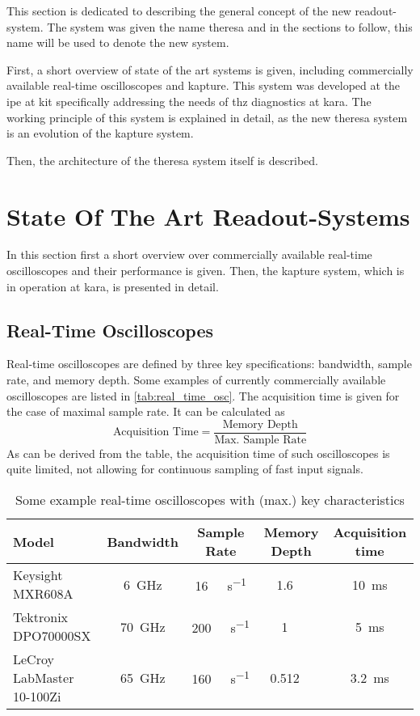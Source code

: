 This section is dedicated to describing the general concept of the new readout-system. 
The system was given the name \gls{theresa} and in the sections to follow, this name will be used to denote the new system.

First, a short overview of state of the art systems is given, including commercially available real-time oscilloscopes and \gls{kapture}.
This system was developed at the \gls{ipe} at \gls{kit} specifically addressing the needs of \gls{thz} diagnostics at \gls{kara}.
The working principle of this system is explained in detail, as the new \gls{theresa} system is an evolution of the \gls{kapture} system. 

Then, the architecture of the \gls{theresa} system itself is described.

\section{State Of The Art Readout-Systems}
In this section first a short overview over commercially available real-time oscilloscopes and their performance is given. 
Then, the \gls{kapture} system, which is in operation at \gls{kara}, is presented in detail.
\subsection*{Real-Time Oscilloscopes}
Real-time oscilloscopes are defined by three key specifications: bandwidth, sample rate, and memory depth.
Some examples of currently commercially available oscilloscopes are listed in \autoref{tab:real_time_osc}.
The acquisition time is given for the case of maximal sample rate.
It can be calculated as 
\begin{equation}
	\text{Acquisition Time} = \frac{\text{Memory Depth}}{\text{Max. Sample Rate}}
\end{equation}
As can be derived from the table, the acquisition time of such oscilloscopes is quite limited, not allowing for continuous sampling of fast input signals.
\begingroup
\renewcommand{\arraystretch}{1.4}
\begin{table}[tb]
	\caption[Real Time Oscilloscopes Examples]{Some example real-time oscilloscopes with (max.) key characteristics}
	\label{tab:real_time_osc}
	\centering
	\begin{tabularx}{\textwidth}{XSSSS}
		\toprule
		\textbf{Model}            & {\textbf{Bandwidth}} &         {\textbf{Sample Rate}}         &  \textbf{{Memory Depth}}  & {\textbf{Acquisition time}} \\ \midrule
		Keysight MXR608A          &    \SI{6}{\GHz}    & \SI{16}{\giga \sample \per \second}  & \SI{1.6}{\giga \sample} &  \SI{10}{\milli \second}  \\
		Tektronix DPO70000SX      &   \SI{70}{\GHz}    & \SI{200}{\giga \sample \per \second} &  \SI{1}{\giga \sample}  &  \SI{5}{\milli \second}   \\
		LeCroy LabMaster 10-100Zi &   \SI{65}{\GHz}    & \SI{160}{\giga \sample \per \second} & \SI{0.512}{\giga \sample} & \SI{3.2}{\milli \second}  \\ \bottomrule
	\end{tabularx}
\end{table}
\endgroup

